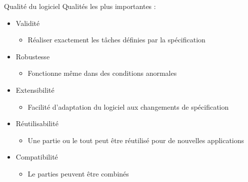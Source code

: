 \documentclass[14pt]{beamer}
\begin{document}
\begin{framentitle}{Qualité du logiciel}
    Qualités les plus importantes :
    \begin{itemize}
        \item Validité
            \begin{itemize}
                \item Réaliser exactement les tâches définies par la
                    spécification
            \end{itemize}
        \item Robustesse
            \begin{itemize}
                \item Fonctionne même dans des conditions anormales
            \end{itemize}
        \item Extensibilité
            \begin{itemize}
                \item Facilité d'adaptation du logiciel aux changements de
                    spécification
            \end{itemize}
        \item Réutilisabilité
            \begin{itemize}
                \item Une partie ou le tout peut être réutilisé pour de
                    nouvelles applications
            \end{itemize}
        \item Compatibilité
            \begin{itemize}
                \item Le parties peuvent être combinés
            \end{itemize}
    \end{itemize}
\end{framentitle}
\end{document}
